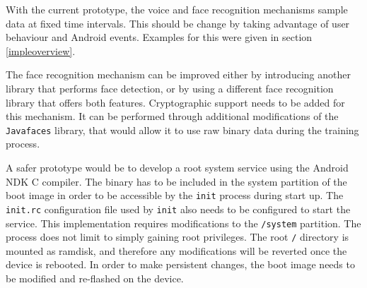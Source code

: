 With the current prototype, the voice and face recognition mechanisms sample data at fixed time intervals. This should be change by taking advantage of user behaviour and Android events. Examples for this were given in section \ref{impleoverview}. 

The face recognition mechanism can be improved either by introducing another library that performs face detection, or by using a different face recognition library that offers both features. Cryptographic support needs to be added for this mechanism. It can be performed through additional modifications of the {\tt Javafaces} library, that would allow it to use raw binary data during the training process.

A safer prototype would be to develop a root system service using the Android NDK C compiler. The binary has to be included in the system partition of the boot image in order to be accessible by the {\tt init} process during start up. The {\tt init.rc} configuration file used by {\tt init} also needs to be configured to start the service. This implementation requires modifications to the {\tt /system} partition. The process does not limit to simply gaining root privileges. The root {\tt /} directory is mounted as ramdisk, and therefore any modifications will be reverted once the device is rebooted. In order to make persistent changes, the boot image needs to be modified and re-flashed on the device.

